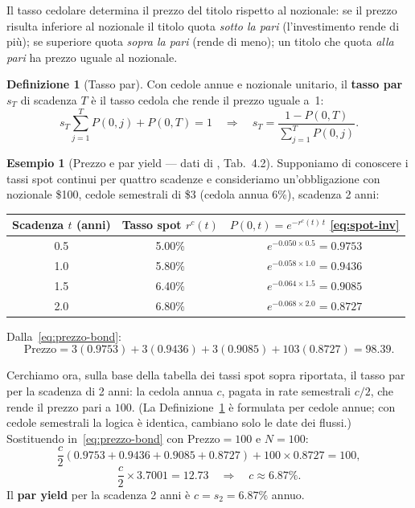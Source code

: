 \documentclass[11pt,a4paper]{article}
\theoremstyle{plain}
\theoremstyle{definition}
\newtheorem{definizione}[teorema]{Definizione}
\newtheorem{esempio}[teorema]{Esempio}
\theoremstyle{remark}
\begin{document}
Il tasso cedolare determina il prezzo del titolo rispetto al nozionale: se il prezzo risulta
inferiore al nozionale il titolo quota \emph{sotto la pari} (l'investimento rende di pi\`u); se
superiore quota \emph{sopra la pari} (rende di meno); un titolo che quota \emph{alla pari} ha
prezzo uguale al nozionale.
\begin{definizione}[Tasso par]
\label{def:par}
Con cedole annue e nozionale unitario, il \textbf{tasso par} $s_T$ di scadenza $T$ \`e
il tasso cedola che rende il prezzo uguale a~1:
\begin{equation}
  \label{eq:tasso_par}
  s_T \sum_{j=1}^{T} P(0,j) + P(0,T) = 1
  \quad\Longrightarrow\quad
  s_T = \frac{1 - P(0,T)}{\displaystyle\sum_{j=1}^{T} P(0,j)}.
\end{equation}
\end{definizione}
\begin{esempio}[Prezzo e par yield --- dati di \cite{hull2018}, Tab.~4.2]
\label{ex:hull42}
Supponiamo di conoscere i tassi spot continui per quattro scadenze e consideriamo un'obbligazione con nozionale \$100, cedole semestrali di \$3 (cedola
annua 6\%), scadenza 2 anni:
\begin{center}\small
\renewcommand{\arraystretch}{1.2}
\begin{tabular}{ccc}
\toprule
Scadenza $t$ (anni) & Tasso spot $r^c(t)$ & $P(0,t) = e^{-r^c(t)\,t}$ \eqref{eq:spot-inv} \\
\midrule
0.5 & 5.00\% & $e^{-0.050\times 0.5} = 0.9753$ \\
1.0 & 5.80\% & $e^{-0.058\times 1.0} = 0.9436$ \\
1.5 & 6.40\% & $e^{-0.064\times 1.5} = 0.9085$ \\
2.0 & 6.80\% & $e^{-0.068\times 2.0} = 0.8727$ \\
\bottomrule
\end{tabular}
\end{center}

 Dalla~\eqref{eq:prezzo-bond}:
\[
  \text{Prezzo}
  = 3(0.9753) + 3(0.9436) + 3(0.9085) + 103(0.8727)
  = 98.39.
\]

Cerchiamo ora, sulla base della tabella dei tassi spot sopra riportata, il tasso par per la
scadenza di 2 anni: la cedola annua $c$, pagata in rate semestrali $c/2$, che rende il
prezzo pari a $100$. (La Definizione~\ref{def:par} \`e formulata per cedole annue; con
cedole semestrali la logica \`e identica, cambiano solo le date dei flussi.)
Sostituendo in~\eqref{eq:prezzo-bond} con $\text{Prezzo}=100$ e $N=100$:
\[
  \frac{c}{2}(0.9753 + 0.9436 + 0.9085 + 0.8727) + 100\times 0.8727 = 100,
\]
\[
  \frac{c}{2}\times 3.7001 = 12.73
  \quad\Longrightarrow\quad
  c \approx 6.87\%.
\]
Il \textbf{par yield} per la scadenza 2 anni \`e $c = s_2 = 6.87\%$ annuo.%
\end{esempio}
\end{document}
